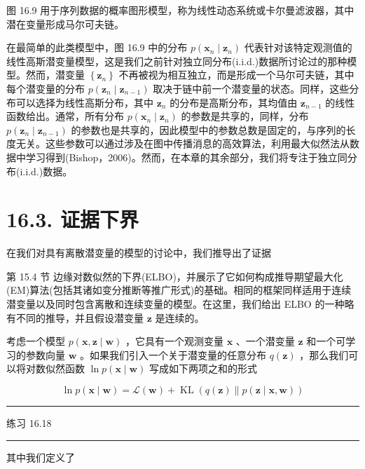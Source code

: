 \documentclass[10pt]{article}
\newcommand{\HRule}{\begin{center}\rule{0.9\linewidth}{0.2mm}\end{center}}
\begin{document}
图 16.9 用于序列数据的概率图形模型，称为线性动态系统或卡尔曼滤波器，其中潜在变量形成马尔可夫链。

在最简单的此类模型中，图 16.9 中的分布 \(p\left( {{\mathbf{x}}_{n} \mid  {\mathbf{z}}_{n}}\right)\) 代表针对该特定观测值的线性高斯潜变量模型，这是我们之前针对独立同分布(i.i.d.)数据所讨论过的那种模型。然而，潜变量 \(\left\{  {\mathbf{z}}_{n}\right\}\) 不再被视为相互独立，而是形成一个马尔可夫链，其中每个潜变量的分布 \(p\left( {{\mathbf{z}}_{n} \mid  {\mathbf{z}}_{n - 1}}\right)\) 取决于链中前一个潜变量的状态。同样，这些分布可以选择为线性高斯分布，其中 \({\mathbf{z}}_{n}\) 的分布是高斯分布，其均值由 \({\mathbf{z}}_{n - 1}\) 的线性函数给出。通常，所有分布 \(p\left( {{\mathbf{x}}_{n} \mid  {\mathbf{z}}_{n}}\right)\) 的参数是共享的，同样，分布 \(p\left( {{\mathbf{z}}_{n} \mid  {\mathbf{z}}_{n - 1}}\right)\) 的参数也是共享的，因此模型中的参数总数是固定的，与序列的长度无关。这些参数可以通过涉及在图中传播消息的高效算法，利用最大似然法从数据中学习得到(Bishop，2006)。然而，在本章的其余部分，我们将专注于独立同分布(i.i.d.)数据。

\section*{16.3. 证据下界}

在我们对具有离散潜变量的模型的讨论中，我们推导出了证据

第 15.4 节 边缘对数似然的下界(ELBO)，并展示了它如何构成推导期望最大化(EM)算法(包括其诸如变分推断等推广形式)的基础。相同的框架同样适用于连续潜变量以及同时包含离散和连续变量的模型。在这里，我们给出 ELBO 的一种略有不同的推导，并且假设潜变量 \(\mathbf{z}\) 是连续的。

考虑一个模型 \(p\left( {\mathbf{x},\mathbf{z} \mid  \mathbf{w}}\right)\) ，它具有一个观测变量 \(\mathbf{x}\) 、一个潜变量 \(\mathbf{z}\) 和一个可学习的参数向量 \(\mathbf{w}\) 。如果我们引入一个关于潜变量的任意分布 \(q\left( \mathbf{z}\right)\) ，那么我们可以将对数似然函数 \(\ln p\left( {\mathbf{x} \mid  \mathbf{w}}\right)\) 写成如下两项之和的形式

\[
\ln p\left( {\mathbf{x} \mid  \mathbf{w}}\right)  = \mathcal{L}\left( \mathbf{w}\right)  + \operatorname{KL}\left( {q\left( \mathbf{z}\right) \parallel p\left( {\mathbf{z} \mid  \mathbf{x},\mathbf{w}}\right) }\right)  \tag{16.57}
\]

\HRule

练习 16.18

\HRule

其中我们定义了
\end{document}
